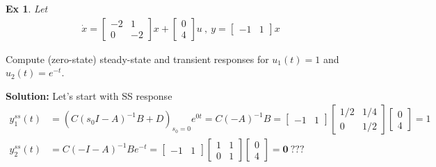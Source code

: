 \documentclass[twoside]{article}
\newtheorem{exmp}[theorem]{Ex}
\begin{document}
\begin{exmp}
Let
\begin{align*} 
\dot{x} = \begin{bmatrix} -2 & 1 \\ 0 & -2 \end{bmatrix} x + \begin{bmatrix} 0 \\ 4 \end{bmatrix} u \ , \ y = \begin{bmatrix} -1 & 1 \end{bmatrix} x 
\end{align*}
\end{exmp}
%
Compute (zero-state) steady-state and transient responses for $u_1(t) = 1$ and $u_2(t) = e^{-t}$.

\textbf{Solution:} Let's start with SS response 
\begin{align*} 
y_1^{ss}(t) &= \left( C \left(s_0 I - A \right)^{-1} B + D \right)_{s_0 = 0} e^{0 t} =
C (-A)^{-1} B =  \begin{bmatrix} -1 & 1 \end{bmatrix}  \begin{bmatrix} 1/2 & 1/4 \\ 0 & 1/2 \end{bmatrix}  \begin{bmatrix} 0 \\ 4 \end{bmatrix} = 1
\\
 y_2^{ss}(t) &= C \left(-I - A \right)^{-1} B e^{- t} = \begin{bmatrix} -1 & 1 \end{bmatrix}  \begin{bmatrix} 1 & 1 \\ 0 & 1 \end{bmatrix}  \begin{bmatrix} 0 \\ 4 \end{bmatrix} = \textbf{0} \ ???
\end{align*}
\end{document}

